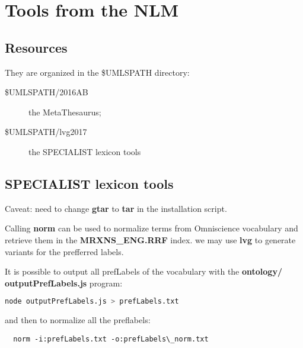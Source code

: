 \documentclass[a4paper,11pt]{report}
\newcommand{\cs}[1]{{\bfseries \ttfamily #1}}
\begin{document}
\chapter{Tools from the NLM}
\section{Resources}
They are organized in the \$UMLSPATH directory:
\begin{description}
\item[\$UMLSPATH/2016AB] the MetaThesaurus;
\item[\$UMLSPATH/lvg2017] the SPECIALIST lexicon tools
\end{description}

\section{SPECIALIST lexicon tools}
Caveat: need to change \cs{gtar} to \cs{tar} in the installation script.

Calling \cs{norm} can be used to normalize terms from Omniscience vocabulary and retrieve them in the \cs{MRXNS\_ENG.RRF} index. we may use \cs{lvg} to generate variants for the prefferred labels.

It is possible to output all prefLabels of the vocabulary with the \cs{ontology/
outputPrefLabels.js} program:
\begin{lstlisting}[language=bash]
  node outputPrefLabels.js > prefLabels.txt
\end{lstlisting}
and then to normalize all the preflabels:
\begin{lstlisting}
  norm -i:prefLabels.txt -o:prefLabels\_norm.txt
\end{lstlisting}
\end{document}
